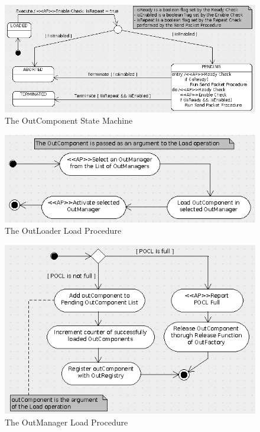 \documentclass[a4paper,10pt]{article}
\begin{document}
\begin{figure}[h]
 \centering
 \includegraphics[scale=0.35,keepaspectratio=true]{OutComponent.png}
 \caption{The OutComponent State Machine}
 \label{fig:OutComponent}
\end{figure}

\begin{figure}[h]
 \centering
 \includegraphics[scale=0.40,keepaspectratio=true]{OutLoaderLoad.png}
 \caption{The OutLoader Load Procedure}
 \label{fig:OutLoaderLoad}
\end{figure}

\begin{figure}[h]
 \centering
 \includegraphics[scale=0.40,keepaspectratio=true]{OutManagerLoad.png}
 \caption{The OutManager Load Procedure}
 \label{fig:OutManagerLoad}
\end{figure}
\end{document}
